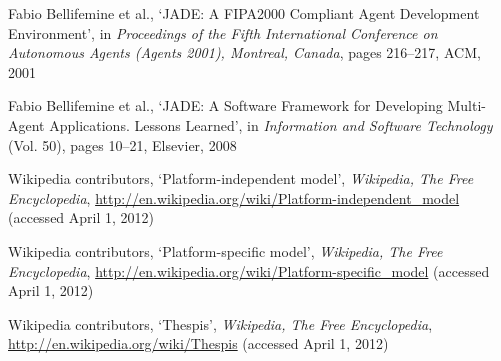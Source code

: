 \begin{thebibliography}{99}
Fabio Bellifemine et al., %
`JADE: A FIPA2000 Compliant Agent Development Environment',
in \textit{Proceedings of the Fifth International Conference on Autonomous Agents (Agents 2001), Montreal, Canada},
pages 216--217,
ACM, 2001

Fabio Bellifemine et al., %
`JADE: A Software Framework for Developing Multi-Agent Applications. Lessons Learned',
in \textit{Information and Software Technology} (Vol. 50),
pages 10--21,
Elsevier, 2008


Wikipedia contributors,
`Platform-independent model',
\textit{Wikipedia, The Free Encyclopedia},
\url{http://en.wikipedia.org/wiki/Platform-independent_model} (accessed April 1, 2012)

Wikipedia contributors,
`Platform-specific model',
\textit{Wikipedia, The Free Encyclopedia},
\url{http://en.wikipedia.org/wiki/Platform-specific_model} (accessed April 1, 2012)

Wikipedia contributors,
`Thespis',
\textit{Wikipedia, The Free Encyclopedia},
\url{http://en.wikipedia.org/wiki/Thespis} (accessed April 1, 2012)

\end{thebibliography}